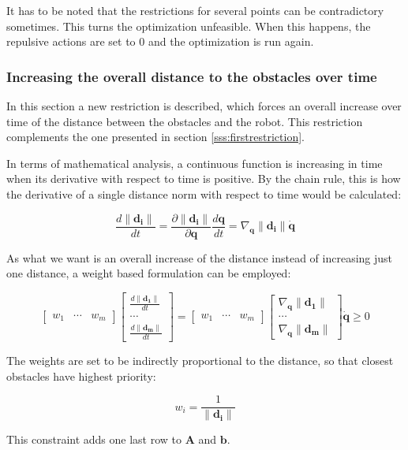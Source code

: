 It has to be noted that the restrictions for several points can be contradictory sometimes. This turns the optimization unfeasible. When this happens, the repulsive actions are set to $0$ and the optimization is run again.

\subsubsection{Increasing the overall distance to the obstacles over time}
\label{sss:secondrestriction}

In this section a new restriction is described, which forces an overall increase over time of the distance between the obstacles and the robot. This restriction complements the one presented in section \ref{sss:firstrestriction}.

In terms of mathematical analysis, a continuous function is increasing in time when its derivative with respect to time is positive. By the chain rule, this is how the derivative of a single distance norm with respect to time would be calculated:

\begin{equation*}
    \frac{ d \|\mathbf{d_i}\|}{dt} =
    \frac{ \partial \|\mathbf{d_i}\|}{\partial \mathbf{q}} \frac{d \mathbf{q}}{dt} =
    \nabla_{\mathbf{q}}\|\mathbf{d_i}\| \dot{\mathbf{q}}
\end{equation*}

As what we want is an overall increase of the distance instead of increasing just one distance, a weight based formulation can be employed:

\begin{equation*}
    \begin{bmatrix}
        w_1 & \cdots & w_m
    \end{bmatrix}
    \begin{bmatrix}
        \frac{ d \|\mathbf{d_1}\|}{dt} \\ \cdots \\ \frac{ d \|\mathbf{d_m}\|}{dt}
    \end{bmatrix}
    =
    \begin{bmatrix}
        w_1 & \cdots & w_m
    \end{bmatrix}
    \begin{bmatrix}
        \nabla_{\mathbf{q}}\|\mathbf{d_1}\| \\
        \cdots \\
        \nabla_{\mathbf{q}}\|\mathbf{d_m}\|
    \end{bmatrix}
    \dot{\mathbf{q}}
    \geq 0
\end{equation*}

The weights are set to be indirectly proportional to the distance, so that closest obstacles have highest priority:

\begin{equation*}
    w_i = \frac{1}{\|\mathbf{d_i}\|}
\end{equation*}

This constraint adds one last row to $\mathbf{A}$ and $\mathbf{b}$.